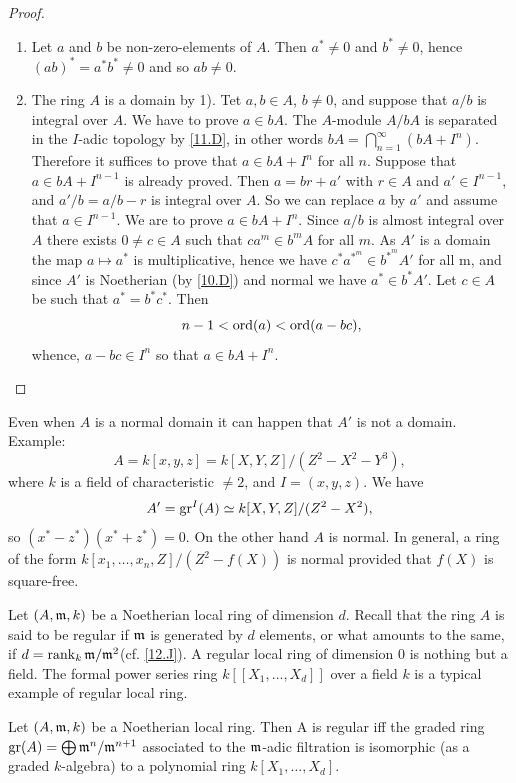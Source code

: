 \documentclass[../main]{subfiles}
\begin{document}
\begin{proof}
    \begin{enumerate}
        \item Let $a$ and $b$ be non-zero-elements of $A$. Then $a^\ast \neq 0$ and $b^{\ast} \neq 0$, hence $(a b)^{\ast}=a^{\ast} b^\ast \neq 0$ and so $a b \neq 0$.
        \item The ring $A$ is a domain by 1). Tet $a, b \in A$, $b \neq 0$, and suppose that $a/b$ is integral over $A$. We have to prove $a \in bA$. The $A$-module $A/bA$ is separated in the $I$-adic topology by \ref{11.D}, in other words $b A=\bigcap_{n=1}^\infty(bA+I^n)$. Therefore it suffices to prove that $a \in bA +I^n$ for all $n$. Suppose that $a \in bA +I^{n-1}$ is already proved. Then $a=b r+a'$ with $r \in A$ and $a' \in I^{n-1}$, and $a' / b=a / b-r$ is integral over $A$. So we can replace $a$ by $a'$ and assume that $a \in I^{n-1}$. We are to prove $a \in bA+I^n$. Since $a/b$ is almost integral over $A$ there exists $0 \neq c \in A$ such that $c a^m \in b^m A$ for all $m$. As $A'$ is a domain the map $a \mapsto a^{\ast}$ is multiplicative, hence we have $c^{\ast} a^{\ast^m} \in b^{\ast^m} A'$ for all m, and since $A'$ is Noetherian (by \ref{10.D}) and normal we have $a^\ast\in b^\ast A'$. Let $c\in A$ be such that $a^\ast = b^\ast c^\ast$. Then \[n-1<\operatorname{ord}(a)<\operatorname{ord}(a-bc),\] whence, $a-bc\in I^n$ so that $a\in bA+I^n$.
    \end{enumerate}
\end{proof}
\begin{remark}
 Even when $A$ is a normal domain it can happen that $A'$ is not a domain. Example: \[A=k[x, y, z]=k[X, Y, Z] / (Z^2-X^2-Y^3),\] where $k$ is a field of characteristic $\neq 2$, and $I=(x, y, z)$. We have \[A'=\operatorname{gr}^I(A) \simeq k[X, Y, Z] /(Z^2-X^2),\] so $(x^{\ast}-z^{\ast})(x^{\ast}+z^{\ast})=0$. On the other hand $A$ is normal. In general, a ring of the form $k[x_1, \ldots, x_n, Z] /(Z^2-f(X))$ is normal provided that $f(X)$ is square-free.
\end{remark}

\newparagraph Let $(A,\mathfrak{m},k)$ be a Noetherian local ring of dimension $d$. Recall that the ring $A$ is said to be regular if $\mathfrak{m}$ is generated by $d$ elements, or what amounts to the same, if $d=\operatorname{rank}_k \mathfrak{m} / \mathfrak{m}^2$(cf. \ref{12.J}). A regular local ring of dimension $0$ is nothing but a field. The formal power series ring $k[[X_1, \dots, X_d]]$ over a field $k$ is a typical example of regular local ring.

\begin{theorem}\label{thm:035}
  Let $(A, \mathfrak{m}, k)$ be a Noetherian local ring. Then A is regular iff the graded ring $\operatorname{gr}(A)=\bigoplus \mathfrak{m}^n / \mathfrak{m}^{n+1}$ associated to the $\mathfrak{m}$-adic filtration is isomorphic (as a graded $k$-algebra) to a polynomial ring $k[X_1, \ldots, X_d]$.
\end{theorem}
\end{document}
